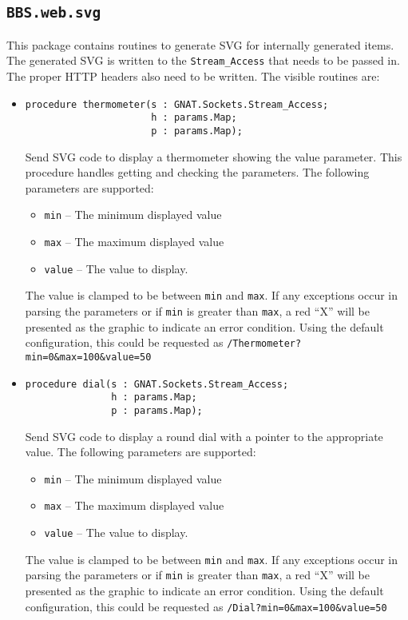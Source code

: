 \documentclass[10pt, openany]{book}
\newcommand{\package}[1]{\texttt{#1}}
\newcommand{\keyword}[1]{\texttt{#1}}
\newcommand{\datatype}[1]{\texttt{#1}}
\begin{document}
\subsection{\package{BBS.web.svg}}
This package contains routines to generate SVG for internally generated items.  The generated SVG is written to the \datatype{Stream\_Access} that needs to be passed in.  The proper HTTP headers also need to be written.  The visible routines are:
\begin{itemize}
  \item \begin{lstlisting}
procedure thermometer(s : GNAT.Sockets.Stream_Access;
                      h : params.Map;
                      p : params.Map);
\end{lstlisting}
  Send SVG code to display a thermometer showing the value parameter.  This procedure handles getting and checking the parameters.  The following parameters are supported:
  \begin{itemize}
    \item \texttt{min} -- The minimum displayed value
    \item \texttt{max} -- The maximum displayed value
    \item \texttt{value} -- The value to display.
  \end{itemize}
  The value is clamped to be between \keyword{min} and \keyword{max}.  If any exceptions occur in parsing the parameters or if \keyword{min} is greater than \keyword{max}, a red ``X'' will be presented as the graphic to indicate an error condition.  Using the default configuration, this could be requested as \texttt{/Thermometer?min=0\&max=100\&value=50}
  \item \begin{lstlisting}
procedure dial(s : GNAT.Sockets.Stream_Access;
               h : params.Map;
               p : params.Map);
\end{lstlisting}
  Send SVG code to display a round dial with a pointer to the appropriate value. The following parameters are supported:
  \begin{itemize}
    \item \texttt{min} -- The minimum displayed value
    \item \texttt{max} -- The maximum displayed value
    \item \texttt{value} -- The value to display.
  \end{itemize}
  The value is clamped to be between \keyword{min} and \keyword{max}.  If any exceptions occur in parsing the parameters or if \keyword{min} is greater than \keyword{max}, a red ``X'' will be presented as the graphic to indicate an error condition.  Using the default configuration, this could be requested as \keyword{/Dial?min=0\&max=100\&value=50}
\end{itemize}
\end{document}
